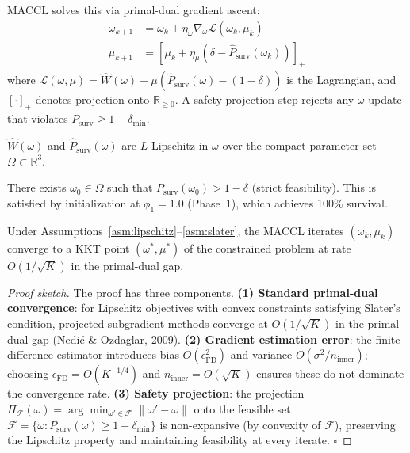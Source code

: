 MACCL solves this via primal-dual gradient ascent:
\begin{align}
  \omega_{k+1} &= \omega_k + \eta_\omega \nabla_\omega \mathcal{L}(\omega_k, \mu_k) \label{eq:primal} \\
  \mu_{k+1} &= \left[\mu_k + \eta_\mu \left(\delta - \hat{P}_{\mathrm{surv}}(\omega_k)\right)\right]_+ \label{eq:dual}
\end{align}
where $\mathcal{L}(\omega, \mu) = \hat{W}(\omega) + \mu(\hat{P}_{\mathrm{surv}}(\omega) - (1-\delta))$
is the Lagrangian, and $[\cdot]_+$ denotes projection onto $\mathbb{R}_{\geq 0}$.
A safety projection step rejects any $\omega$ update that violates $P_{\mathrm{surv}} \geq 1 - \delta_{\min}$.

\begin{assumption}
\label{asm:lipschitz}
$\hat{W}(\omega)$ and $\hat{P}_{\mathrm{surv}}(\omega)$ are $L$-Lipschitz
in $\omega$ over the compact parameter set $\Omega \subset \mathbb{R}^3$.
\end{assumption}

\begin{assumption}
\label{asm:slater}
There exists $\omega_0 \in \Omega$ such that
$P_{\mathrm{surv}}(\omega_0) > 1 - \delta$ (strict feasibility).
This is satisfied by initialization at $\phi_1{=}1.0$ (Phase~1),
which achieves 100\% survival.
\end{assumption}

\begin{theorem}
\label{thm:maccl_convergence}
Under Assumptions~\ref{asm:lipschitz}--\ref{asm:slater},
the MACCL iterates $(\omega_k, \mu_k)$ converge to a KKT point
$(\omega^*, \mu^*)$ of the constrained problem at rate
$O(1/\sqrt{K})$ in the primal-dual gap.
\end{theorem}

\begin{proof}[Proof sketch]
The proof has three components.
\textbf{(1) Standard primal-dual convergence}:
for Lipschitz objectives with convex constraints satisfying Slater's condition,
projected subgradient methods converge at $O(1/\sqrt{K})$ in the
primal-dual gap (Nedi\'{c} \& Ozdaglar, 2009).
\textbf{(2) Gradient estimation error}:
the finite-difference estimator introduces bias $O(\epsilon_{\mathrm{FD}}^2)$
and variance $O(\sigma^2 / n_{\mathrm{inner}})$;
choosing $\epsilon_{\mathrm{FD}} = O(K^{-1/4})$
and $n_{\mathrm{inner}} = O(\sqrt{K})$ ensures these do not
dominate the convergence rate.
\textbf{(3) Safety projection}:
the projection $\Pi_{\mathcal{F}}(\omega) = \arg\min_{\omega' \in \mathcal{F}} \|\omega' - \omega\|$
onto the feasible set $\mathcal{F} = \{\omega : P_{\mathrm{surv}}(\omega) \geq 1 - \delta_{\min}\}$
is non-expansive (by convexity of $\mathcal{F}$), preserving
the Lipschitz property and maintaining feasibility
at every iterate. \hfill $\square$
\end{proof}

